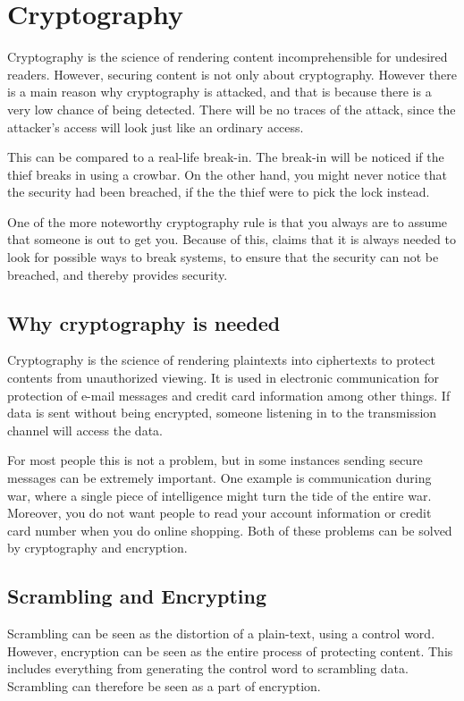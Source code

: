 \chapter{Cryptography}\label{ch:Scrambling}
Cryptography is the science of rendering content incomprehensible for 
undesired readers. However, securing content is not only about 
cryptography. However there is a main reason why cryptography is 
attacked, and that is because there is a very low chance of being 
detected. There will be no traces of the attack, since the attacker’s 
access will look just like an ordinary access. \citep{Schneier:2003}

This can be compared to a real-life break-in. The break-in will be 
noticed if the thief breaks in using a crowbar. On the other hand, you 
might never notice that the security had been breached, if the the 
thief were to pick the lock instead. \citep{Schneier:2003}

One of the more noteworthy cryptography rule is that you always are to 
assume that someone is out to get you. Because of this, 
\citet[pp. 12--14]{Schneier:2003} claims that it is always needed to 
look for possible ways to break systems, to ensure that the security 
can not be breached, and thereby provides security.

\section{Why cryptography is needed}
Cryptography is the science of rendering plaintexts into ciphertexts to 
protect contents from unauthorized viewing. It is used in electronic 
communication for protection of e-mail messages and credit card 
information among other things. If data is sent without being encrypted,
someone listening in to the transmission channel will access the data.

For most people this is not a problem, but in some instances sending 
secure messages can be extremely important. One example is 
communication during war, where a single piece of intelligence might 
turn the tide of the entire war. Moreover, you do not want people to 
read your account information or credit card number when you do online 
shopping. Both of these problems can be solved by cryptography and 
encryption.


\section{Scrambling and Encrypting}
Scrambling can be seen as the distortion of a plain-text, using a 
control word. However, encryption can be seen as the entire process of 
protecting content. This includes everything from generating the 
control word to scrambling data. Scrambling can therefore be seen as a 
part of encryption.

